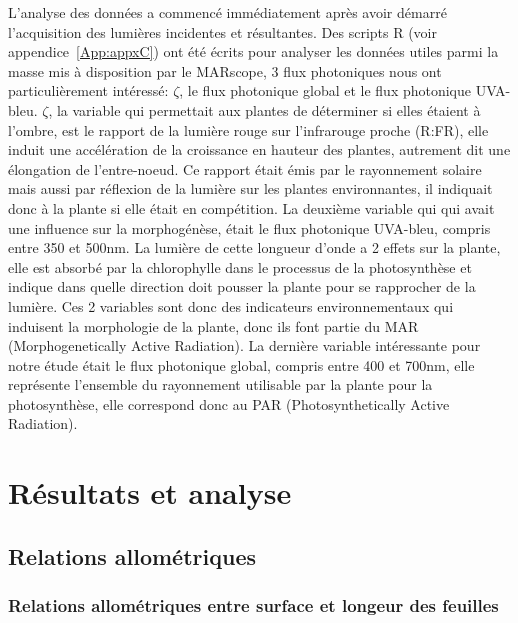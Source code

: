 ﻿\documentclass[12pt]{report}
\begin{document}
L'analyse des données a commencé immédiatement après avoir démarré
l'acquisition des lumières incidentes et résultantes.
Des scripts R\citep{R_ref38} (voir appendice~\ref{App:appxC}) ont été écrits pour
analyser les données utiles parmi la masse mis à disposition par le
MARscope, 3 flux photoniques nous ont particulièrement intéressé: $\zeta$, le flux
photonique global et le flux photonique UVA-bleu. $\zeta$, la variable qui
permettait aux plantes de déterminer si elles étaient à l'ombre, est le rapport de
la lumière rouge sur l'infrarouge proche (R:FR), elle
induit une accélération de la croissance en hauteur des plantes, autrement dit
une élongation de l'entre-noeud. Ce rapport était émis par le rayonnement
solaire mais aussi par réflexion de la lumière sur les plantes environnantes, il
indiquait donc à la plante si elle était en compétition. La deuxième variable qui
qui avait une influence sur la morphogénèse, était le flux photonique UVA-bleu,
compris entre 350 et 500nm. La lumière de cette longueur d'onde a 2 effets sur
la plante, elle est absorbé par la chlorophylle dans le processus de la
photosynthèse et indique dans quelle
direction doit pousser la plante pour se rapprocher de la lumière. Ces 2
variables sont donc des indicateurs environnementaux qui induisent la
morphologie de la plante, donc ils font partie du MAR (Morphogenetically Active
Radiation). La dernière variable intéressante pour notre étude était le flux
photonique global, compris entre 400 et 700nm, elle représente l'ensemble du rayonnement
utilisable par la plante pour la photosynthèse, elle correspond donc au PAR
(Photosynthetically Active Radiation).



\chapter{Résultats et analyse}


\section{Relations allométriques}

\subsection{Relations allométriques entre surface et longeur des feuilles}
\end{document}
